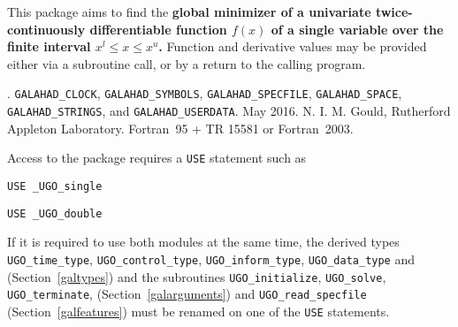 \documentclass{galahad}
\newcommand{\packagename}{UGO}
\newcommand{\fullpackagename}{\libraryname\_\packagename}
\begin{document}
\galheader


\galsummary
This package aims to find the {\bf global minimizer of a univariate
twice-continuously differentiable function $f(x)$ of a single variable
over the finite interval $x^l \leq x \leq x^u$.} Function and derivative
values may be provided either via a subroutine call, or by a return
to the calling program.


\galattributes
\galversions{\tt  \fullpackagename\_single, \fullpackagename\_double}.
\galuses
{\tt GALAHAD\_CLOCK},
{\tt GALAHAD\_SY\-M\-BOLS},
{\tt GALAHAD\_SPECFILE},
{\tt GALAHAD\_SPACE},
{\tt GALAHAD\_STRINGS},
and
{\tt GALAHAD\_USERDATA}.
\galdate May 2016.
\galorigin N. I. M. Gould, Rutherford Appleton Laboratory.
\gallanguage Fortran~95 + TR 15581 or Fortran~2003.


\galhowto


Access to the package requires a {\tt USE} statement such as

\medskip{}

\hspace{8mm} {\tt USE \fullpackagename\_single}

\medskip{}

\hspace{8mm} {\tt USE  \fullpackagename\_double}

\medskip

\noindent
If it is required to use both modules at the same time, the derived types
{\tt \packagename\_time\_\-type},
{\tt \packagename\_control\_type},
{\tt \packagename\_inform\_type},
{\tt \packagename\_data\_type}
and
(Section~\ref{galtypes})
and the subroutines
{\tt \packagename\_initialize},
{\tt \packagename\_\-solve},
{\tt \packagename\_terminate},
(Section~\ref{galarguments})
and
{\tt \packagename\_read\_specfile}
(Section~\ref{galfeatures})
must be renamed on one of the {\tt USE} statements.

\end{document}
